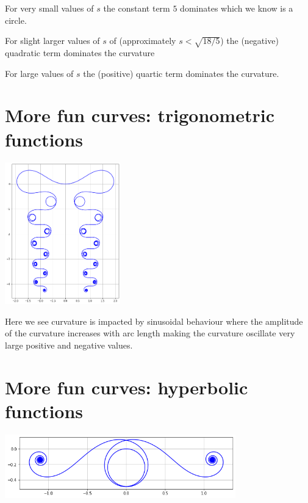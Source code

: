 \documentclass[12pt]{article} %
\theoremstyle{definition}
\theoremstyle{theorem}
\begin{document}
For very small values of $s$ the constant term $5$ dominates which we know is a circle.

For slight larger values of $s$ of (approximately $s<\sqrt{18/5}$) the (negative) quadratic term dominates the curvature

For large values of $s$ the (positive) quartic term dominates the curvature.


\section{More fun curves: trigonometric functions}
\begin{tcolorbox}
	\begin{minipage}{\linewidth}
		\centering
		\includegraphics[width=50mm, scale=0.2]{elegant_madness.png}
	\end{minipage}
\end{tcolorbox}

Here we see curvature is impacted by sinusoidal behaviour where the amplitude of the curvature increases with arc length making the curvature oscillate very large positive and negative values.
	
\section{More fun curves: hyperbolic functions}
\begin{tcolorbox}
	\begin{minipage}{\linewidth}
	\centering
	\includegraphics[width=100mm, scale=0.5]{sinh.png}
\end{minipage}
\end{tcolorbox}
\end{document}
